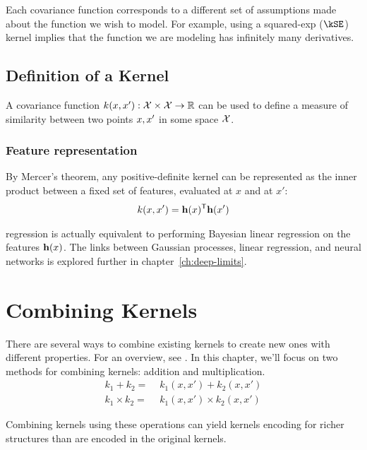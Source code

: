 Each covariance function corresponds to a different set of assumptions made about the function we wish to model.
For example, using a squared-exp ($\kSE$) kernel implies that the function we are modeling has infinitely many derivatives.


\subsection{Definition of a Kernel}

A covariance function $k(x, x') : \mathcal{X} \times \mathcal{X} \to \mathbb{R}$ can be used to define a measure of similarity between two points $x, x'$ in some space $\mathcal{X}$.

\subsubsection{Feature representation}
%
By Mercer's theorem,
any positive-definite kernel can be represented as the inner product between a fixed set of features, evaluated at $x$ and at $x'$:
%
\begin{align}
k(x,x') = {\bf{h}}(x){^\mathsf{T}} {\bf{h}}(x')
\end{align}

\gp{} regression is actually equivalent to performing Bayesian linear regression on the features ${\bf{h}}(x)$.
The links between Gaussian processes, linear regression, and neural networks is explored further in chapter~\ref{ch:deep-limits}.


\section{Combining Kernels}

There are several ways to combine existing kernels to create new ones with different properties.
For an overview, see \cite[Chapter~4]{rasmussen38gaussian}. 
In this chapter, we'll focus on two methods for combining kernels: addition and multiplication.
\begin{align}
k_1 + k_2 =& \,\, k_1(x,x') + k_2(x,x')\\
k_1 \times k_2 =& \,\, k_1(x,x') \times k_2(x,x')
\end{align}

Combining kernels using these operations can yield kernels encoding for richer structures than are encoded in the original kernels.


